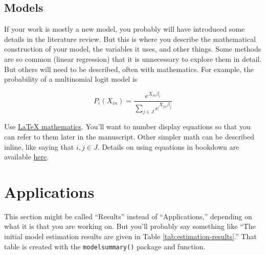 \documentclass[3p, authoryear]{elsarticle} %
\begin{document}
\hypertarget{models}{%
\subsection{Models}\label{models}}

If your work is mostly a new model, you probably will have introduced some
details in the literature review. But this is where you describe the
mathematical construction of your model, the variables it uses, and other
things. Some methods are so common (linear regression) that it is unnecessary to
explore them in detail. But others will need to be described, often with
mathematics. For example, the probability of a multinomial logit model is

\begin{equation}
  P_i(X_{in}) = \frac{e^{X_{in}\beta_i}}{\sum_{j \in J}e^{X_{jn}\beta_j}}
  \label{eq:mnl}
\end{equation}

Use \href{https://www.overleaf.com/learn/latex/mathematical_expressions}{LaTeX mathematics}.
You'll want to number display equations so that you can
refer to them later in the manuscript. Other simpler math can be described inline,
like saying that \(i, j \in J\). Details on using equations in bookdown are available
\href{https://bookdown.org/yihui/bookdown/markdown-extensions-by-bookdown.html}{here}.

\hypertarget{applications}{%
\section{Applications}\label{applications}}

This section might be called ``Results'' instead of ``Applications,'' depending
on what it is that you are working on. But you'll probably say something like
``The initial model estimation results are given in Table \ref{tab:estimation-results}.''
That table is created with the \texttt{modelsummary()} package and function.
\end{document}
